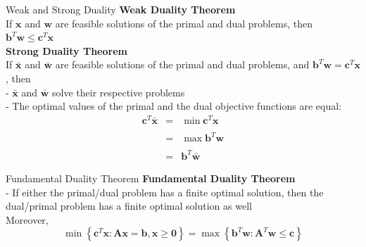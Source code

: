\documentclass[aspectratio=169,hyperref,UTF8,CJK]{beamer}
\begin{document}
\begin{frame}{Weak and Strong Duality}
\textbf{Weak Duality Theorem} \\
If \(\mathbf{x}\) and \(\mathbf{w}\) are feasible solutions of the primal and dual problems, then \(\mathbf{b}^T\mathbf{w}\leq \mathbf{c}^T\mathbf{x}\) \\
\textbf{Strong Duality Theorem} \\
If \(\bar{\mathbf{x}}\) and \(\bar{\mathbf{w}}\) are feasible solutions of the primal and dual problems, and \(\mathbf{b}^T\mathbf{w} = \mathbf{c}^T\mathbf{x}\) , then \\
- \(\bar{\mathbf{x}}\) and \(\bar{\mathbf{w}}\) solve their respective problems \\
- The optimal values of the primal and the dual objective functions are equal:
\[
\begin{array}{rcl}{\mathbf{c}^T\mathbf{\bar{x}}}&{=}&{\min \mathbf{c}^T\mathbf{x}}\\{}&{}&{}\\{}&{=}&{\max \mathbf{b}^T\mathbf{w}}\\{}&{}&{}\\{}&{=}&{\mathbf{b}^T\mathbf{\bar{w}}}\end{array}
\]
\end{frame}

\begin{frame}{Fundamental Duality Theorem}
\textbf{Fundamental Duality Theorem} \\
- If either the primal/dual problem has a finite optimal solution, then the dual/primal problem has a finite optimal solution as well \\
Moreover,
\[
\min \left\{\mathbf{c}^T\mathbf{x}:\mathbf{A}\mathbf{x} = \mathbf{b},\mathbf{x}\geq \mathbf{0}\right\} = \max \left\{\mathbf{b}^T\mathbf{w}:\mathbf{A}^T\mathbf{w}\leq \mathbf{c}\right\}
\]
\end{frame}
\end{document}
